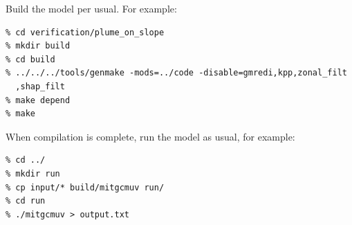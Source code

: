 Build the model per usual. For example:
\begin{verbatim}
% cd verification/plume_on_slope
% mkdir build
% cd build
% ../../../tools/genmake -mods=../code -disable=gmredi,kpp,zonal_filt
  ,shap_filt
% make depend
% make
\end{verbatim}

When compilation is complete, run the model as usual, for example:
\begin{verbatim}
% cd ../
% mkdir run
% cp input/* build/mitgcmuv run/
% cd run
% ./mitgcmuv > output.txt
\end{verbatim}
